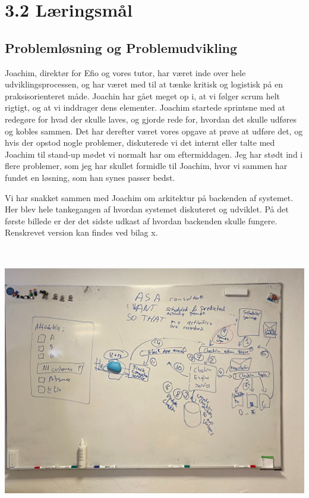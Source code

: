 \documentclass[11pt]{report}
\begin{document}
\section*{3.2 Læringsmål}
\subsection*{Problemløsning og Problemudvikling}
Joachim, direktør for Efio og vores tutor, har været inde over hele udviklingsprocessen, 
og har været med til at tænke kritisk og logistisk på en praksisorienteret måde. 
Joachin har gået meget op i, at vi følger scrum helt rigtigt, og at vi inddrager dens elementer. 
Joachim startede sprintsne med at redegøre for hvad der skulle laves, og gjorde rede for, hvordan det skulle udføres og kobles sammen. 
Det har derefter været vores opgave at prøve at udføre det, og hvis der opstod nogle problemer, 
diskuterede vi det internt eller talte med Joachim til stand-up mødet vi normalt har om eftermiddagen. 
Jeg har stødt ind i flere problemer, som jeg har skullet formidle til Joachim, hvor vi sammen har fundet en løsning, som han synes passer bedst. 

Vi har snakket sammen med Joachim om arkitektur på backenden af systemet. Her blev hele tankegangen af hvordan systemet diskuteret og udviklet. 
På det første billede er der det sidste udkast af hvordan backenden skulle fungere. Renskrevet version kan findes ved bilag x.
\begin{center}
\includegraphics[height=11.93cm, width=15.9cm]{struktur}
\end{center}
\end{document}
